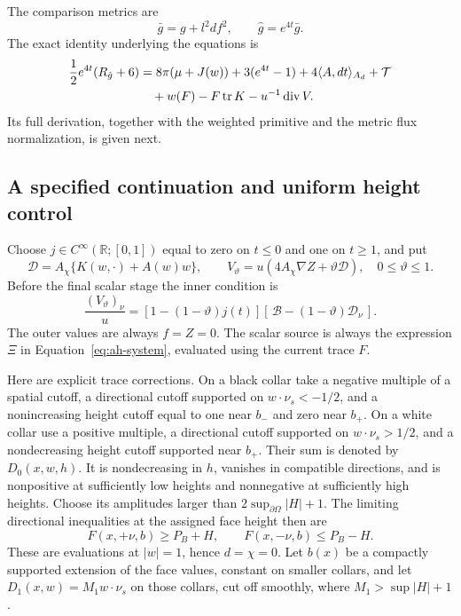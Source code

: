 The comparison metrics are
\[
 \bar g=g+l^2df^2,\qquad \hat g=e^{4t}\bar g.
\]
The exact identity underlying the equations is
\begin{equation}\label{eq:ah-curvature}
\begin{aligned}
 \frac12e^{4t}(R_{\hat g}+6)
 &=8\pi(\mu+J(w))+3(e^{4t}-1)
  +4\langle A,dt\rangle_{A_d}
  +\mathcal T\\
 &\quad+w(F)-F\operatorname{tr} K-u^{-1}\operatorname{div}V .
\end{aligned}
\end{equation}
Its full derivation, together with the weighted primitive and the
metric flux normalization, is given next.



\subsection{A specified continuation and uniform height control}
\label{subsec:ah-homotopy}

Choose \(j\in C^\infty(\mathbb R;[0,1])\) equal to zero on
\(t\le0\) and one on \(t\ge1\), and put
\[
 \mathcal D=A_\chi\{K(w,\cdot)+A(w)w\},\qquad
 V_\vartheta=u(4A_\chi\nabla Z+\vartheta\mathcal D),
 \quad 0\le\vartheta\le1.
\]
Before the final scalar stage the inner condition is
\begin{equation}\label{eq:ah-homotopy-boundary}
 \frac{(V_\vartheta)_\nu}{u}
 =[1-(1-\vartheta)j(t)]
       [\,\mathcal B-(1-\vartheta)\mathcal D_\nu\,].
\end{equation}
The outer values are always \(f=Z=0\).  The scalar source is always
the expression \(\Xi\) in Equation~\eqref{eq:ah-system}, evaluated
using the current trace \(F\).

Here are explicit trace corrections.  On a black collar take a
negative multiple of a spatial cutoff, a directional cutoff
supported on \(w\cdot\nu_s<-1/2\), and a nonincreasing height cutoff
equal to one near \(b_-\) and zero near \(b_+\).  On a white collar
use a positive multiple, a directional cutoff supported on
\(w\cdot\nu_s>1/2\), and a nondecreasing height cutoff supported
near \(b_+\).  Their sum is denoted by \(D_0(x,w,h)\).
It is nondecreasing in \(h\), vanishes in compatible directions,
and is nonpositive at sufficiently low heights and nonnegative at
sufficiently high heights.  Choose its amplitudes larger than
\(2\sup_{\partial\Omega}|H|+1\).  The limiting directional
inequalities at the assigned face height then are
\begin{equation}\label{eq:ah-directional-barriers}
 F(x,+\nu,b)\ge P_B+H,\qquad
 F(x,-\nu,b)\le P_B-H .
\end{equation}
These are evaluations at \(|w|=1\), hence \(d=\chi=0\).
Let \(b(x)\) be a compactly supported extension of the face values,
constant on smaller collars, and let
\(D_1(x,w)=M_1w\cdot\nu_s\) on those collars, cut off smoothly,
where \(M_1>\sup|H|+1\).


